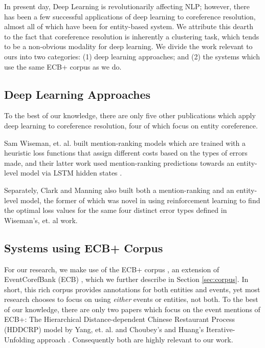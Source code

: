 \documentclass[11pt,a4paper]{article}
\begin{document}
In present day, Deep Learning is revolutionarily affecting NLP; however, there has been a few successful applications of deep learning to coreference resolution, almost all of which have been for entity-based system.  We attribute this dearth to the fact that coreference resolution is inherently a clustering task, which tends to be a non-obvious modality for deep learning.  We divide the work relevant to ours into two categories: (1) deep learning approaches; and (2) the systems which use the same ECB+ corpus \cite{ECB+} as we do.

\subsection{Deep Learning Approaches}
To the best of our knowledge, there are only five other publications which apply deep learning to coreference resolution, four of which focus on entity coreference.

Sam Wiseman, et. al. built mention-ranking models  which are trained with a heuristic loss functions that assign different costs based on the types of errors made, and their latter work used mention-ranking predictions towards an entity-level model via LSTM hidden states \cite{Hochreiter:1997:LSM:1246443.1246450}.

Separately, Clark and Manning  also built both a mention-ranking and an entity-level model, the former of which was novel in using reinforcement learning to find the optimal loss values for the same four distinct error types defined in Wiseman's, et. al  work.

\subsection{Systems using ECB+ Corpus}
For our research, we make use of the ECB+ corpus \cite{ECB+}, an extension of EventCorefBank (ECB) \cite{Bejan:2010:UEC:1858681.1858824}, which we further describe in Section \ref{sec:corpus}.  In short, this rich corpus provides annotations for both entities and events, yet most research chooses to focus on using \textit{either} events or entities, not both.  To the best of our knowledge, there are only two papers which focus on the event mentions of ECB+: The Hierarchical Distance-dependent Chinese Restaurant Process (HDDCRP) model by Yang, et. al.  and Choubey's and Huang's Iterative-Unfolding approach .   Consequently both are highly relevant to our work.
\end{document}
